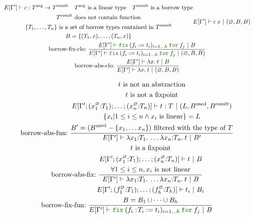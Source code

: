 \documentclass[a4paper,fleqn]{article}
\newcommand{\kwfix}{\mbox{\color{mygreen}\ttfamily fix}}
\newcommand{\kwfor}{\mbox{\color{mygreen}\ttfamily for}}
\newcommand{\lam}[2]{\lambda #1.\:#2}
\newcommand{\lamTB}[2]{\lambda #1\mathord{:}#2.\:}
\newcommand{\lassum}[2]{(#1\mathord{:}#2)}
\newcommand{\fix}[4]{\kwfix\:(#1 := #2)_{#3}\:\kwfor\:#4}
\newcommand{\fixT}[5]{\kwfix\:(#1:\!#2 := #3)_{#4}\:\kwfor\:#5}
\begin{document}
\begin{gather*}
{\begin{gathered}
        E[\Gamma'] \vdash c : T^\text{arg} \rightarrow T^\text{result} \quad
        \text{$T^\text{arg}$ is a linear type} \quad
        \text{$T^\text{result}$ is a borrow type} \\
        \text{$T^\text{result}$ does not contain function} \\
        \text{$\{T_1, \ldots, T_n\}$ is a set of borrow types contained in $T^\text{result}$} \\
        B = \{(T_1,x),\ldots,(T_n,x)\}
      \end{gathered}
    }{
      E[\Gamma'] \vdash c\:x ~|~ (\varnothing, B, B)
    } \\
  \text{borrow-fix-clo:}~
    \dfrac{
      E[\Gamma'] \vdash \fix{f_i}{t_i}{i=1\ldots h}{f_j} ~|~ B
    }{
      E[\Gamma'] \vdash \fix{f_i}{t_i}{i=1\ldots h}{f_j} ~|~ (\varnothing, B, B)
    } \\
  \text{borrow-abs-clo:}~
    \dfrac{
      E[\Gamma'] \vdash \lam{x}{t} ~|~ B
    }{
      E[\Gamma'] \vdash \lam{x}{t} ~|~ (\varnothing, B, B)
    } \\
\end{gather*}

\begin{gather*}
  \text{borrow-abs-fun:}~
    \dfrac{
      \begin{gathered}
        \text{$t$ is not an abstraction} \\
        \text{$t$ is not a fixpoint} \\
        E[\Gamma';\lassum{x_1^\varnothing}{T_1};\ldots;\lassum{x_n^\varnothing}{T_n}] \vdash t : T ~|~ (L,B^\text{used},B^\text{result}) \\
        \{ x_i | 1 \leq i \leq n \wedge \text{$x_i$ is linear} \} = L \\
        B' = (B^\text{used} - \{x_1,\ldots x_n\}) ~\text{filtered with the type of $T$} \\
      \end{gathered}
    }{
      E[\Gamma'] \vdash \lamTB{x_1}{T_1}\ldots\lamTB{x_n}{T_n}t ~|~ B'
    } \\
  \text{borrow-abs-fix:}~
    \dfrac{
      \begin{gathered}
        \text{$t$ is a fixpoint} \\
        E[\Gamma';\lassum{x_1^\varnothing}{T_1};\ldots;\lassum{x_n^\varnothing}{T_n}] \vdash t ~|~ B \\
        \forall 1 \leq i \leq n, \text{$x_i$ is not linear} \\
      \end{gathered}
    }{
      E[\Gamma'] \vdash \lamTB{x_1}{T_1}\ldots\lamTB{x_n}{T_n}t ~|~ B
    } \\
  \text{borrow-fix-fun:}~
    \dfrac{
      \begin{gathered}
        E[\Gamma';\lassum{f_1^\varnothing}{T_1};\ldots;\lassum{f_h^\varnothing}{T_h}] \vdash t_i ~|~ B_i \\
        B = B_1\cup \cdots \cup B_h
      \end{gathered}
    }{
      E[\Gamma'] \vdash \fixT{f_i}{T_i}{t_i}{i=1\ldots h}{f_j} ~|~ B
    } \\
\end{gather*}
\end{document}
